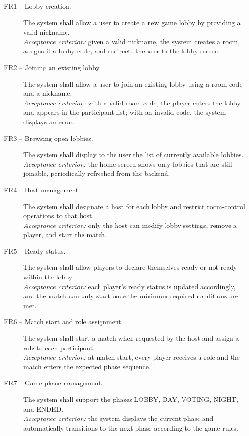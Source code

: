 \documentclass{scrartcl}
\begin{document}
\begin{description}
    \item[FR1 -- Lobby creation.] The system shall allow a user to create a new game lobby by providing a valid nickname.\\
    \textit{Acceptance criterion:} given a valid nickname, the system creates a room, assigns it a lobby code, and redirects the user to the lobby screen.

    \item[FR2 -- Joining an existing lobby.] The system shall allow a user to join an existing lobby using a room code and a nickname.\\
    \textit{Acceptance criterion:} with a valid room code, the player enters the lobby and appears in the participant list; with an invalid code, the system displays an error.

    \item[FR3 -- Browsing open lobbies.] The system shall display to the user the list of currently available lobbies.\\
    \textit{Acceptance criterion:} the home screen shows only lobbies that are still joinable, periodically refreshed from the backend.

    \item[FR4 -- Host management.] The system shall designate a host for each lobby and restrict room-control operations to that host.\\
    \textit{Acceptance criterion:} only the host can modify lobby settings, remove a player, and start the match.

    \item[FR5 -- Ready status.] The system shall allow players to declare themselves ready or not ready within the lobby.\\
    \textit{Acceptance criterion:} each player's ready status is updated accordingly, and the match can only start once the minimum required conditions are met.

    \item[FR6 -- Match start and role assignment.] The system shall start a match when requested by the host and assign a role to each participant.\\
    \textit{Acceptance criterion:} at match start, every player receives a role and the match enters the expected phase sequence.

    \item[FR7 -- Game phase management.] The system shall support the phases LOBBY, DAY, VOTING, NIGHT, and ENDED.\\
    \textit{Acceptance criterion:} the system displays the current phase and automatically transitions to the next phase according to the game rules.


\end{description}
\end{document}
